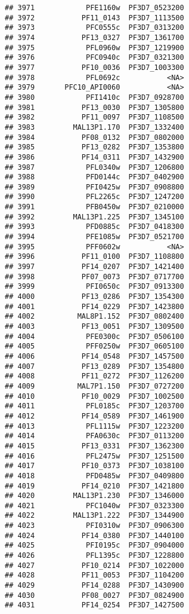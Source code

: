 \documentclass{article}\usepackage[]{graphicx}\usepackage[]{color}
\makeatletter
\newenvironment{kframe}{%
 \def\at@end@of@kframe{}%
 \ifinner\ifhmode%
  \def\at@end@of@kframe{\end{minipage}}%
  \begin{minipage}{\columnwidth}%
 \fi\fi%
 \def\FrameCommand##1{\hskip\@totalleftmargin \hskip-\fboxsep
 \colorbox{shadecolor}{##1}\hskip-\fboxsep
     \hskip-\linewidth \hskip-\@totalleftmargin \hskip\columnwidth}%
 \MakeFramed {\advance\hsize-\width
   \@totalleftmargin\z@ \linewidth\hsize
   \@setminipage}}%
 {\par\unskip\endMakeFramed%
 \at@end@of@kframe}
\newenvironment{knitrout}{}{} %
\makeatother
\begin{document}
\begin{knitrout}
\begin{kframe}
\begin{verbatim}
## 3971            PFE1160w  PF3D7_0523200
## 3972           PF11_0143  PF3D7_1113500
## 3973            PFC0555c  PF3D7_0313200
## 3974           PF13_0327  PF3D7_1361700
## 3975            PFL0960w  PF3D7_1219900
## 3976            PFC0940c  PF3D7_0321300
## 3977           PF10_0036  PF3D7_1003300
## 3978            PFL0692c           <NA>
## 3979       PFC10_API0060           <NA>
## 3980            PFI1410c  PF3D7_0928700
## 3981           PF13_0030  PF3D7_1305800
## 3982           PF11_0097  PF3D7_1108500
## 3983         MAL13P1.170  PF3D7_1332400
## 3984           PF08_0132  PF3D7_0802000
## 3985           PF13_0282  PF3D7_1353800
## 3986           PF14_0311  PF3D7_1432900
## 3987            PFL0340w  PF3D7_1206800
## 3988            PFD0144c  PF3D7_0402900
## 3989            PFI0425w  PF3D7_0908800
## 3990            PFL2265c  PF3D7_1247200
## 3991            PFB0450w  PF3D7_0210000
## 3992         MAL13P1.225  PF3D7_1345100
## 3993            PFD0885c  PF3D7_0418300
## 3994            PFE1085w  PF3D7_0521700
## 3995            PFF0602w           <NA>
## 3996           PF11_0100  PF3D7_1108800
## 3997           PF14_0207  PF3D7_1421400
## 3998           PF07_0073  PF3D7_0717700
## 3999            PFI0650c  PF3D7_0913300
## 4000           PF13_0286  PF3D7_1354300
## 4001           PF14_0229  PF3D7_1423800
## 4002          MAL8P1.152  PF3D7_0802400
## 4003           PF13_0051  PF3D7_1309500
## 4004            PFE0300c  PF3D7_0506100
## 4005            PFF0250w  PF3D7_0605100
## 4006           PF14_0548  PF3D7_1457500
## 4007           PF13_0289  PF3D7_1354800
## 4008           PF11_0272  PF3D7_1126200
## 4009          MAL7P1.150  PF3D7_0727200
## 4010           PF10_0029  PF3D7_1002500
## 4011            PFL0185c  PF3D7_1203700
## 4012           PF14_0589  PF3D7_1461900
## 4013            PFL1115w  PF3D7_1223200
## 4014            PFA0630c  PF3D7_0113200
## 4015           PF13_0331  PF3D7_1362300
## 4016            PFL2475w  PF3D7_1251500
## 4017           PF10_0373  PF3D7_1038100
## 4018            PFD0485w  PF3D7_0409800
## 4019           PF14_0210  PF3D7_1421800
## 4020         MAL13P1.230  PF3D7_1346000
## 4021            PFC1040w  PF3D7_0323300
## 4022         MAL13P1.222  PF3D7_1344900
## 4023            PFI0310w  PF3D7_0906300
## 4024           PF14_0380  PF3D7_1440100
## 4025            PFI0195c  PF3D7_0904000
## 4026            PFL1395c  PF3D7_1228800
## 4027           PF10_0214  PF3D7_1022000
## 4028           PF11_0053  PF3D7_1104200
## 4029           PF14_0288  PF3D7_1430900
## 4030           PF08_0027  PF3D7_0824900
## 4031           PF14_0254  PF3D7_1427500

\end{verbatim}
\end{kframe}
\end{knitrout}
\end{document}
